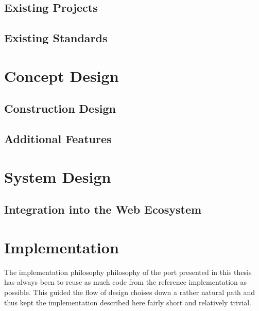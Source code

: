 \documentclass[oneside,11pt,xetex]{scrbook}
\begin{document}
\section{Existing Projects}

\section{Existing Standards}


\chapter{Concept Design}
\label{chap:ConceptDesign}

\section{Construction Design}

\section{Additional Features}


\chapter{System Design}
\label{chap:System Design}

\section{Integration into the Web Ecosystem}


\chapter{Implementation}
\label{chap:Implementation}

The implementation philosophy philosophy of the port presented in this thesis has always been to
reuse as much code from the reference implementation as possible. This guided the flow of design
choises down a rather natural path and thus kept the implementation described here fairly short and
relatively trivial.
\end{document}
